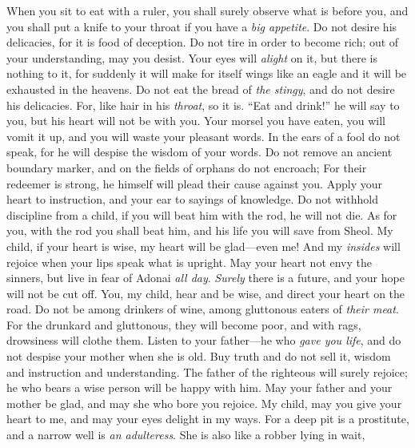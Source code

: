 \begin{biblechapter} %
\verse When you sit to eat with a ruler, 
you shall surely observe what is before you,
\verse and you shall put a knife to your throat 
if you have a \textit{big appetite}.
\verse Do not desire his delicacies, 
for it is food of deception.
\verse Do not tire in order to become rich; 
out of your understanding, may you desist.
\verse Your eyes will \textit{alight} on it, but there is nothing to it, 
for suddenly it will make for itself wings 
like an eagle and it will be exhausted in the heavens.
\verse Do not eat the bread of \textit{the stingy}, 
and do not desire his delicacies.
\verse For, like hair in his \textit{throat}, so it is. 
“Eat and drink!” he will say to you, 
but his heart will not be with you.
\verse Your morsel you have eaten, you will vomit it up, 
and you will waste your pleasant words.
\verse In the ears of a fool do not speak, 
for he will despise the wisdom of your words.
\verse Do not remove an ancient boundary marker, 
and on the fields of orphans do not encroach;
\verse For their redeemer is strong, 
he himself will plead their cause against you.
\verse Apply your heart to instruction, 
and your ear to sayings of knowledge.
\verse Do not withhold discipline from a child, 
if you will beat him with the rod, he will not die.
\verse As for you, with the rod you shall beat him, 
and his life you will save from Sheol.
\verse My child, if your heart is wise, 
my heart will be glad—even me!
\verse And my \textit{insides} will rejoice 
when your lips speak what is upright.
\verse May your heart not envy the sinners, 
but live in fear of Adonai \textit{all day}.
\verse \textit{Surely} there is a future, 
and your hope will not be cut off.
\verse You, my child, hear and be wise, 
and direct your heart on the road.
\verse Do not be among drinkers of wine, 
among gluttonous eaters of \textit{their meat}.
\verse For the drunkard and gluttonous, they will become poor, 
and with rags, drowsiness will clothe them.
\verse Listen to your father—he who \textit{gave you life}, 
and do not despise your mother when she is old.
\verse Buy truth and do not sell it, 
wisdom and instruction and understanding.
\verse The father of the righteous will surely rejoice; 
he who bears a wise person will be happy with him.
\verse May your father and your mother be glad, 
and may she who bore you rejoice.
\verse My child, may you give your heart to me, 
and may your eyes delight in my ways.
\verse For a deep pit is a prostitute, 
and a narrow well is \textit{an adulteress}.
\verse She is also like a robber lying in wait, 

\end{biblechapter}

